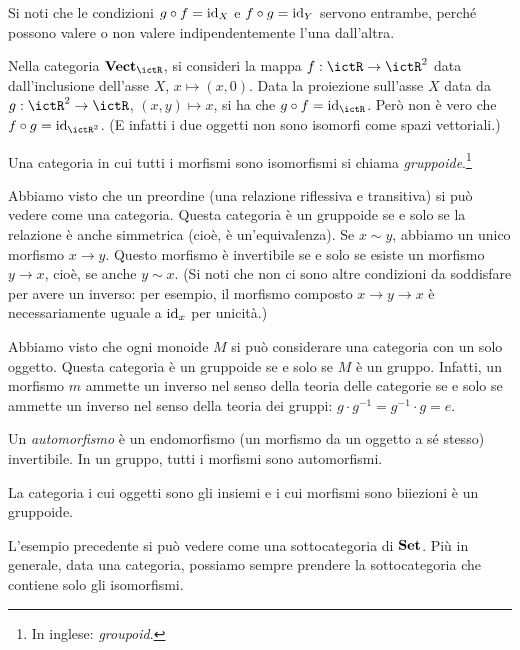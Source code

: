 Si noti che le condizioni $g\circ f = \mathrm{id}_X$ e $f\circ g=\mathrm{id}_Y$ servono entrambe, perché possono valere o non valere indipendentemente l'una dall'altra. 
\begin{example}
 Nella categoria $\ctVect_\ictR$, si consideri la mappa $f:\ictR\to\ictR^2$ data dall'inclusione dell'asse $X$, $x\mapsto(x,0)$. Data la proiezione sull'asse $X$ data da $g:\ictR^2\to\ictR$, $(x,y)\mapsto x$, si ha che $g\circ f=\id_\ictR$. Però non è vero che $f\circ g = \id_{\ictR^2}$. (E infatti i due oggetti non sono isomorfi come spazi vettoriali.)
\end{example}

\begin{definition}
 Una categoria in cui tutti i morfismi sono isomorfismi si chiama \emph{gruppoide}.\footnote{In inglese: \emph{groupoid}.} 
\end{definition}

\begin{example}
 Abbiamo visto che un preordine (una relazione riflessiva e transitiva) si può vedere come una categoria. Questa categoria è un gruppoide se e solo se la relazione è anche simmetrica (cioè, è un'equivalenza). Se $x\sim y$, abbiamo un unico morfismo $x\to y$. Questo morfismo è invertibile se e solo se esiste un morfismo $y\to x$, cioè, se anche $y\sim x$. (Si noti che non ci sono altre condizioni da soddisfare per avere un inverso: per esempio, il morfismo composto $x\to y\to x$ è necessariamente uguale a $\mathrm{id}_x$ per unicità.)
\end{example}

\begin{example}
 Abbiamo visto che ogni monoide $M$ si può considerare una categoria con un solo oggetto. Questa categoria è un gruppoide se e solo se $M$ è un gruppo. Infatti, un morfismo $m$ ammette un inverso nel senso della teoria delle categorie se e solo se ammette un inverso nel senso della teoria dei gruppi: $g\cdot g^{-1}=g^{-1}\cdot g = e$. 
\end{example}

Un \emph{automorfismo} è un endomorfismo (un morfismo da un oggetto a sé stesso) invertibile. In un gruppo, tutti i morfismi sono automorfismi.

\begin{example}
 La categoria i cui oggetti sono gli insiemi e i cui morfismi sono biiezioni è un gruppoide.
\end{example}

L'esempio precedente si può vedere come una sottocategoria di $\mathbf{Set}$.
Più in generale, data una categoria, possiamo sempre prendere la sottocategoria che contiene solo gli isomorfismi.

